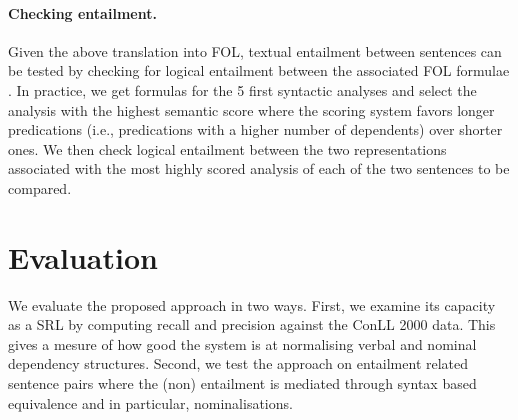 \documentclass[twocolumn,10pt]{article}
\renewcommand\cite{\citep}
\begin{document}
\paragraph{Checking entailment.}
Given the above translation into FOL, textual entailment between
sentences can be tested by checking for logical entailment between the
associated FOL formulae \cite{blackburn99:_infer_and_comput_seman}. 
In practice, we get formulas for the 5 first syntactic analyses and
select the analysis with the highest semantic score where the scoring
system favors longer predications (i.e., predications with a higher
number of dependents) over shorter ones.  We then check logical
entailment between the two representations associated with the most
highly scored analysis of each of the two sentences to be compared.
\section{Evaluation}
\label{sec:evaluation}


We evaluate the proposed approach in two ways. First, we examine its
capacity as a SRL by computing recall and precision against the ConLL
2000 data. This gives a mesure of how good the system is at
normalising verbal and nominal dependency structures. Second, we test
the approach on entailment related sentence pairs where the (non)
entailment is mediated through syntax based equivalence and in
particular, nominalisations. 
\end{document}
